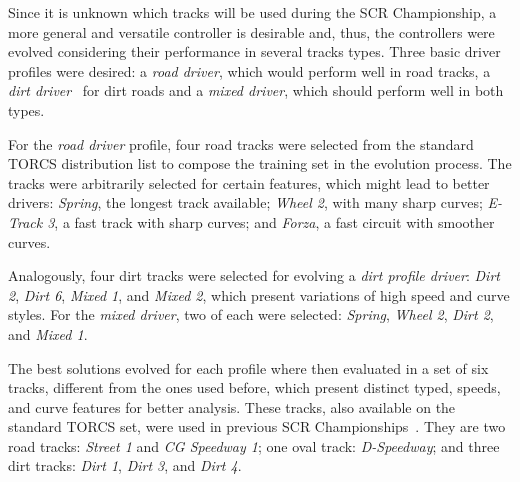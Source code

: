 \newcommand{\profile}[1]{\emph{#1 driver}}%
Since it is unknown which tracks will be used during the SCR Championship, a more general and versatile controller is desirable and, thus, the controllers were evolved considering their performance in several tracks types. Three basic driver profiles were desired: a \profile{road}, which would perform well in road tracks, a \profile{dirt}~ for dirt roads and a \profile{mixed}, which should perform well in both types.

\newcommand{\track}[1]{\emph{#1}}%
For the \profile{road} profile, four road tracks were selected from the standard TORCS distribution list to compose the training set in the evolution process. The tracks were arbitrarily selected for certain features, which might lead to better drivers: \track{Spring}, the longest track available; \track{Wheel 2}, with many sharp curves; \track{E-Track 3}, a fast track with sharp curves; and \track{Forza}, a fast circuit with smoother curves.

Analogously, four dirt tracks were selected for evolving a \profile{dirt profile}: \track{Dirt 2}, \track{Dirt 6}, \track{Mixed 1}, and \track{Mixed 2}, which present variations of high speed and curve styles. For the \profile{mixed}, two of each were selected: \track{Spring}, \track{Wheel 2}, \track{Dirt 2}, and \track{Mixed 1}.


The best solutions evolved for each profile where then evaluated in a set of six tracks, different from the ones used before, which present distinct typed, speeds, and curve features for better analysis. These tracks, also available on the standard TORCS set, were used in previous SCR Championships~\cite{AUTOPIA2009}. They are two road tracks: \track{Street 1} and \track{CG Speedway 1}; one oval track: \track{D-Speedway}; and three dirt tracks: \track{Dirt 1}, \track{Dirt 3}, and \track{Dirt 4}.

